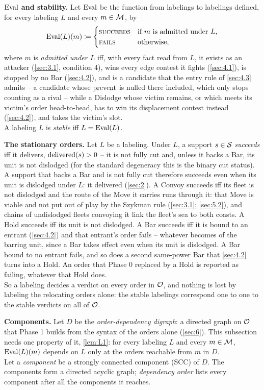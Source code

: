 \documentclass[12pt,a4paper]{article}
\begin{document}
\textbf{$\operatorname{Eval}$ and stability.}
Let $\operatorname{Eval}$ be the function from labelings to labelings defined, for every labeling $L$ and every $m \in \mathcal{M}$, by
\[
\operatorname{Eval}(L)(m) \coloneqq
\begin{cases}
\textsc{succeeds} & \text{if } m \text{ is admitted under } L, \\
\textsc{fails} & \text{otherwise,}
\end{cases}
\]
where $m$ is \emph{admitted under $L$} iff, with every fact read from $L$, it exists as an attacker (\cref{sec:3.1}, condition 4), wins every edge contest it fights (\cref{sec:4.1}), is stopped by no Bar (\cref{sec:4.2}), and is a candidate that the entry rule of \cref{sec:4.3} admits -- a candidate whose $\operatorname{prevent}$ is nulled there included, which only stops counting as a rival -- while a Dislodge whose victim remains, or which meets its victim's order head-to-head, has to win its displacement contest instead (\cref{sec:4.2}), and takes the victim's slot.\\
A labeling $L$ is \emph{stable} iff $L = \operatorname{Eval}(L)$.

\textbf{The stationary orders.}
Let $L$ be a labeling.
Under $L$, a support $s \in \mathcal{S}$ \emph{succeeds} iff it delivers, $\operatorname{delivered}(s) > 0$ -- it is not fully cut and, unless it backs a Bar, its unit is not dislodged (for the standard degeneracy this is the binary cut status).
A support that backs a Bar and is not fully cut therefore succeeds even when its unit is dislodged under $L$: it delivered (\cref{sec:2}).
A Convoy succeeds iff its fleet is not dislodged and the route of the Move it carries runs through it: that Move is viable and not put out of play by the Szykman rule (\cref{sec:3.1}; \cref{sec:5.2}), and chains of undislodged fleets convoying it link the fleet's sea to both coasts.
A Hold succeeds iff its unit is not dislodged.
A Bar succeeds iff it is bound to an entrant (\cref{sec:4.2}) and that entrant's order fails -- whatever becomes of the barring unit, since a Bar takes effect even when its unit is dislodged.
A Bar bound to no entrant fails, and so does a second same-power Bar that \cref{sec:4.2} turns into a Hold.
An order that Phase 0 replaced by a Hold is reported as failing, whatever that Hold does.\\
So a labeling decides a verdict on every order in $\mathcal{O}$, and nothing is lost by labeling the relocating orders alone: the stable labelings correspond one to one to the stable verdicts on all of $\mathcal{O}$.

\textbf{Components.}
Let $D$ be the \emph{order-dependency digraph}: a directed graph on $\mathcal{O}$ that Phase 1 builds from the syntax of the orders alone (\cref{sec:6}).
This subsection needs one property of it, \cref{lem:L1}: for every labeling $L$ and every $m \in \mathcal{M}$, $\operatorname{Eval}(L)(m)$ depends on $L$ only at the orders reachable from $m$ in $D$.\\
Let a \emph{component} be a strongly connected component (SCC) of $D$.
The components form a directed acyclic graph; \emph{dependency order} lists every component after all the components it reaches.
\end{document}
